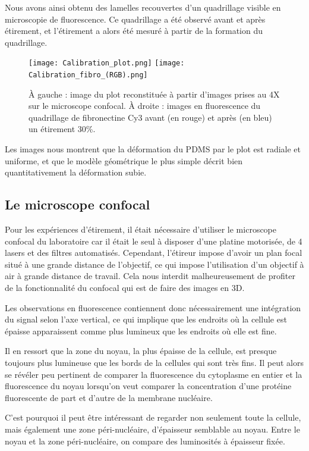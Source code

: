 \documentclass{report}
\begin{document}
	Nous avons ainsi obtenu des lamelles recouvertes d'un quadrillage visible en microscopie de fluorescence. Ce quadrillage a été observé avant et après étirement, et l'étirement a alors été mesuré à partir de la formation du quadrillage.
	
	\begin{figure}
	\texttt{[image: Calibration\_plot.png]}
	\texttt{[image: Calibration\_fibro\_(RGB).png]}
	\caption{À gauche : image du plot reconstituée à partir d'images prises au 4X sur le microscope confocal. À droite : images en fluorescence du quadrillage de fibronectine Cy3 avant (en rouge) et après (en bleu) un étirement 30\%.}
	\end{figure}
	
	Les images nous montrent que la déformation du PDMS par le plot est radiale et uniforme, et que le modèle géométrique le plus simple décrit bien quantitativement la déformation subie. 
	
	\subsection{Le microscope confocal}
	
	Pour les expériences d'étirement, il était nécessaire d'utiliser le microscope confocal du laboratoire car il était le seul à disposer d'une platine motorisée, de 4 lasers et des filtres automatisés. Cependant, l'étireur impose d'avoir un plan focal situé à une grande distance de l'objectif, ce qui impose l'utilisation d'un objectif à air à grande distance de travail. Cela nous interdit malheureusement de profiter de la fonctionnalité du confocal qui est de faire des images en 3D. 
	
	Les observations en fluorescence contiennent donc nécessairement une intégration du signal selon l'axe vertical, ce qui implique que les endroits où la cellule est épaisse apparaissent comme plus lumineux que les endroits où elle est fine. 
	
	Il en ressort que la zone du noyau, la plus épaisse de la cellule, est presque toujours plus lumineuse que les bords de la cellules qui sont très fins. 
	Il peut alors se révéler peu pertinent de comparer la fluorescence du cytoplasme en entier et la fluorescence du noyau lorsqu'on veut comparer la concentration d'une protéine fluorescente de part et d'autre de la membrane nucléaire.
	
	C'est pourquoi il peut être intéressant de regarder non seulement toute la cellule, mais également une zone péri-nucléaire, d'épaisseur semblable au noyau. Entre le noyau et la zone péri-nucléaire, on compare des luminosités à épaisseur fixée.
	
\end{document}
